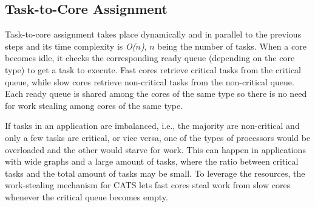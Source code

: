 \subsection{Task-to-Core Assignment}
\label{sec.cats.assignment}
Task-to-core assignment takes place dynamically and in parallel to the previous steps and its time complexity is \textit{O($n$)}, \textit{$n$} being the number of tasks. When a core becomes idle, it checks the corresponding ready queue (depending on the core type) to get a task to execute. Fast cores retrieve critical tasks from the critical queue, while slow cores retrieve non-critical tasks from the non-critical queue. Each ready queue is shared among the cores of the same type so there is no need for work stealing among cores of the same type. 

If tasks in an application are imbalanced, i.e., the majority are non-critical and only a few tasks are critical, or vice versa, one of the types of processors would be overloaded and the other would starve for work. This can happen in applications with wide graphs and a large amount of tasks, where the ratio between critical tasks and the total amount of tasks may be small. To leverage the resources, the work-stealing mechanism for CATS lets fast cores steal work from slow cores whenever the critical queue becomes empty. 
